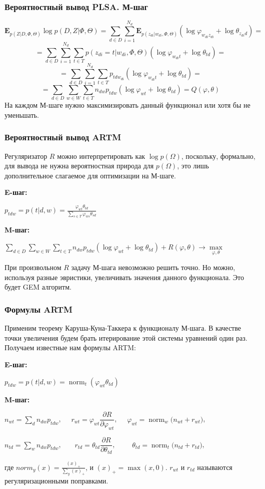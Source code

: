\documentclass[utf8]{beamer}
\DeclareMathOperator{\norm}{norm}
\renewcommand{\phi}{\varphi}
\begin{document}
	 	\begin{frame}
		\frametitle{Вероятностный вывод PLSA. М-шаг}   
\[
\mathbf{E}_{p(Z|D,\Phi, \Theta)} \log p(D,Z|\Phi,\Theta) = 
\sum_{d \in D} \sum_{i=1}^{N_d} \mathbf{E}_{p(z_{di}|w_{di}, \Phi, \Theta)} (\log \phi_{w_{di} z_{di}} + \log \theta_{z_{di} d}) =
\]
\[
= \sum_{d\in D}\sum_{i=1}^{N_d} \sum_{t \in T} p(z_{di}=t|w_{di},\Phi,\Theta) (\log \phi_{w_{di} t} + \log \theta_{td}) =
\]
\[
= \sum_{d\in D}\sum_{i=1}^{N_d} \sum_{t \in T} p_{tdw_{di}} (\log \phi_{w_{di} t} + \log \theta_{td}) =
\]
\[
=\sum_{d\in D}\sum_{w \in W} \sum_{t \in T} n_{dw} p_{tdw} (\log \phi_{wt} + \log \theta_{td}) = Q(\phi, \theta)
\]
На каждом М-шаге нужно максимизировать данный функционал или хотя бы не уменьшать.
	\end{frame}
	
	\begin{frame}
	\frametitle{Вероятностный вывод ARTM}
	Регуляризатор $R$ можно интерпретировать как $\log p(\Omega)$, поскольку, формально, для вывода не нужна вероятностная природа для $p(\Omega)$, это лишь дополнительное слагаемое для оптимизации на М-шаге.
	\medskip
	
	\textbf{E-шаг:}	
   		 
   		 \qquad $p_{tdw} = p(t|d, w) = \frac{\phi_{wt} \theta_{td}}{\sum\limits_{s\in T} \phi_{ws} \theta_{sd}}$ 		 
 		\medskip
 		
 	\textbf{M-шаг:}
 	
   		 
   		 \qquad $\sum\limits_{d\in D}\sum\limits_{w \in W} \sum\limits_{t \in T} n_{dw} p_{tdw} (\log \phi_{wt} + \log \theta_{td})  + R(\phi,\theta) \to \max\limits_{\phi,\theta}$
   	\medskip
   		 
	При произвольном $R$ задачу М-шага невозможно решить точно. Но можно, используя разные эвристики, увеличивать значения данного функционала. Это будет GEM алгоритм.
	\end{frame}
	
 	\begin{frame}
		\frametitle{Формулы ARTM}   
		Применим теорему Каруша-Куна-Таккера к функционалу М-шага. В качестве точки увеличения будем брать итерирование этой системы уравнений один раз. Получаем известные нам формулы ARTM:
		\medskip
		
   		\textbf{E-шаг:}	
   		 
   		 \qquad $p_{tdw} = p(t|d, w) = \norm_t(\varphi_{wt} \theta_{td})$ 		 
 		\medskip
 		
 		\textbf{M-шаг:}
    
 		\qquad $n_{wt} = \sum\limits_{d} n_{dw} p_{tdw}$,\ \ \ $r_{wt} =  \phi_{wt}\dfrac{\partial R}{\partial\phi_{wt}}$,\ \ \  $\phi_{wt}   = \norm_w\big(n_{wt} + r_{wt}\big)$,

 		\qquad $n_{td} = \sum\limits_{w} n_{dw} p_{tdw}$,\ \ \  \ $r_{td} =  \theta_{td}\dfrac{\partial R}{\partial\theta_{td}}$,\ \ \ \ \ $\theta_{td} = \norm_t  \big(n_{td} + r_{td}\big)$,
\medskip

	где $norm_y(x) = \frac{(x)_{+}}{\sum\limits_y (x)_{+}}$, и $(x)_{+} = \max(x, 0)$. $r_{wt}$ и $r_{td}$ называются регуляризационными поправками. 
	\end{frame}
\end{document}
